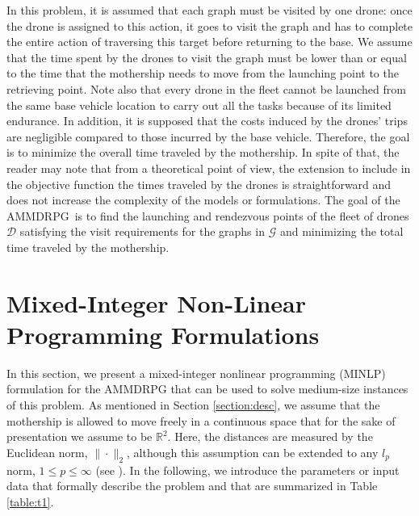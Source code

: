 \documentclass[10pt,a4paper]{elsarticle}
\def\AMD{{\sf AMMDRPG\xspace}}
\newcommand{\EN}[1]{{\color{black}#1}}
\begin{document}
\noindent
In this problem, it is assumed that each graph must be visited by one drone: once the drone is assigned to this action, it goes to visit the graph and has to complete the entire action of traversing this target before \EN{returning} to the base. 
We assume that the time spent by the drones to visit the graph must be lower than or equal to the time that the mothership needs to move from the launching point to the retrieving point. Note also that every drone \EN{in} the fleet cannot be launched from the same base vehicle location to \EN{carry out} all the tasks because of its limited endurance. In addition, it is supposed that the costs induced by the drones' trips are negligible compared to those incurred by the base vehicle. Therefore, the goal is to minimize the overall time traveled by the mothership. In spite of that, the reader may note that from a theoretical point of view, the extension to include in the objective function the times traveled by the drones is straightforward and does not increase the complexity of the models \EN{or} formulations.
\noindent
The goal of the \AMD \ is to find the launching and rendezvous points of the fleet of drones $\mathcal D$ satisfying the visit requirements for the graphs in $\mathcal G$ and minimizing the total time traveled by the mothership.\\

\noindent

\section{Mixed\EN{-}Integer Non\EN{-}Linear Programming Formulations}\label{Form}
\noindent
In this section, we present a mixed-integer nonlinear programming (MINLP) formulation for the \AMD \;\hspace{-2pt}  that can be used to solve medium\EN{-}size instances of this problem.
\noindent
As mentioned in Section \ref{section:desc}, we assume that the mothership is allowed to move freely in a continuous space that for the sake of presentation we  assume to be $\mathbb R^2$. Here, the distances are measured by the Euclidean norm, $\|\cdot\|_2$, although this assumption can be extended to any $l_p$ norm, $1\leq p\leq \infty$ (see \cite{Blanco2017}).
\noindent
In the following, we introduce the parameters or input data that formally describe the problem and that are summarized in Table \ref{table:t1}.
\end{document}
